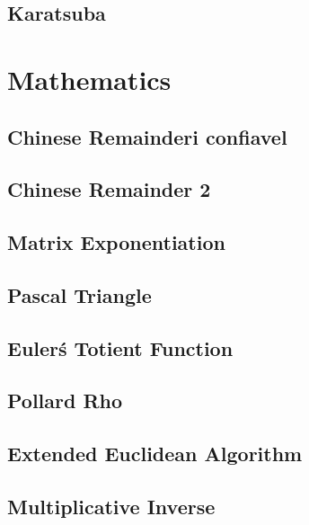 \subsection{Karatsuba}
\raggedbottom
\hrulefill

\section{Mathematics}
\subsection{Chinese Remainderi confiavel}
\raggedbottom
\hrulefill
\subsection{Chinese Remainder 2}
\raggedbottom
\hrulefill
\subsection{Matrix Exponentiation}
\raggedbottom
\hrulefill
\subsection{Pascal Triangle}
\raggedbottom
\hrulefill
\subsection{Euler\'s Totient Function}
\raggedbottom
\hrulefill
\subsection{Pollard Rho}
\raggedbottom
\hrulefill
\subsection{Extended Euclidean Algorithm}
\raggedbottom
\hrulefill
\subsection{Multiplicative Inverse}
\raggedbottom
\hrulefill
